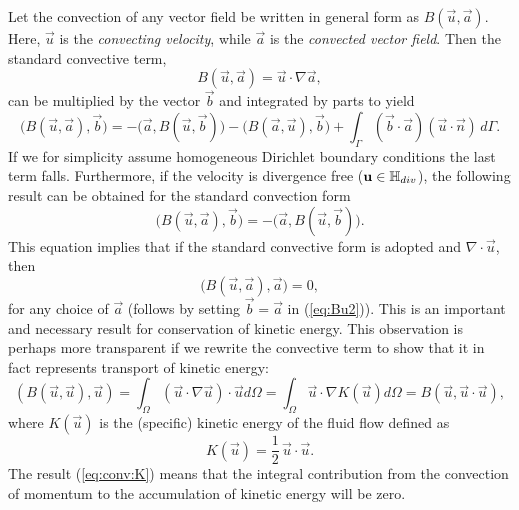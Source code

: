 Let the convection of any vector field be written in general form as $B(\vec{u},\vec{a})$. Here, $\vec{u}$ is the \emph{convecting velocity}, while $\vec{a}$ is the \emph{convected vector field}. Then the standard convective term, 
\begin{equation}
B(\vec{u},\vec{a}) = \vec{u}\cdot \nabla \vec{a}, 
\end{equation}
can be multiplied by the vector $\vec{b}$ and integrated by parts to yield
\begin{equation}
 \bigl( B(\vec{u}, \vec{a}), \vec{b}\bigr) = -\bigl( \vec{a}, B(\vec{u},\vec{b})\bigr) - \bigl( B (\vec{a}, \vec{u}), \vec{b} \bigr) + \int_{\Gamma} \left(\vec{b} \cdot \vec{a} \right)\left(\vec{u} \cdot \vec{n} \right) \, d\Gamma.
\label{eq:Bu1}
\end{equation}
If we for simplicity assume homogeneous Dirichlet boundary conditions the last term falls. Furthermore, if the velocity is divergence free ($\mathbf{ u }\in \mathbb{H}_{div}$), the following result can be obtained for the standard convection form
\begin{equation}
\bigl( B(\vec{u},\vec{a}), \vec{b} \bigr) = -\bigl( \vec{a}, B(\vec{u},\vec{b}) \bigr).
\label{eq:Bu2}
\end{equation}
This equation implies that if 
the standard convective form is adopted and $\nabla\cdot\vec{u}$, then
\begin{equation} 
\bigl( B(\vec{u}, \vec{a}), \vec{a} \bigr) = 0,
\label{eq:B0}
\end{equation}
for any choice of $\vec{a}$ (follows by setting $\vec{b}=\vec{a}$ in
(\ref{eq:Bu2})). This is an important and necessary result for
conservation of kinetic energy. This observation is perhaps more
transparent if we rewrite the convective term to show that it in fact
represents transport of kinetic energy:
\begin{equation}
\label{eq:conv:K}
\left(B(\vec{u}, \vec{u}), \vec{u} \right) 
= \int_\Omega (\vec{u}\cdot\nabla\vec{u})\cdot\vec{u}d\Omega
= \int_\Omega \vec{u}\cdot\nabla K(\vec{u}) d\Omega
= B(\vec{u}, \vec{u}\cdot\vec{u}),
\end{equation}
where $K(\vec{u})$ is the (specific) kinetic energy of the fluid flow defined
as
\begin{equation}
 K(\vec{u})=\frac{1}{2}\, \vec{u}\cdot \vec{u}. \label{eq:K}
\end{equation}
The result (\ref{eq:conv:K})  means that the integral
contribution from the convection of momentum to the accumulation of
kinetic energy will be zero.

